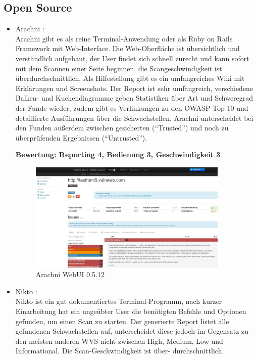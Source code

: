 \documentclass[12pt,oneside,a4paper,parskip]{scrbook}
\begin{document}
    \subsection{Open Source}
        \begin{itemize}
          \item Arachni \cite{Arachni}:\\
            Arachni gibt es als reine Terminal-Anwendung oder als Ruby on Rails Framework mit Web-Interface. Die Web-Oberfläche ist übersichtlich und verständlich aufgebaut, der User findet sich schnell zurecht und kann sofort mit dem Scannen einer Seite beginnen, die Scangeschwindigkeit ist überdurchschnittlich. Als Hilfestellung gibt es ein umfangreiches Wiki mit Erklärungen und Screenshots. Der Report ist sehr umfangreich, verschiedene Balken- und Kuchendiagramme geben Statistiken über Art und Schweregrad der Funde wieder, zudem gibt es Verlinkungen zu den OWASP Top 10 und detaillierte Ausführungen über die Schwachstellen. Arachni unterscheidet bei den Funden außerdem zwischen gesicherten (``Trusted'') und noch zu überprüfenden Ergebnissen (``Untrusted'').

            \textbf{Bewertung: Reporting 4, Bedienung 3, Geschwindigkeit 3}
            \begin{figure}[H]
              \centering
              \includegraphics[width=0.9\textwidth]{Images/Arachni}
              \caption[Arachni WebUI 0.5.12]{Arachni WebUI 0.5.12}
            \end{figure}
          \item Nikto \cite{Nikto}:\\
            Nikto ist ein gut dokumentiertes Terminal-Programm, nach kurzer Einarbeitung hat ein ungeübter User die benötigten Befehle und Optionen gefunden, um einen Scan zu starten.
            Der generierte Report listet alle gefundenen Schwachstellen auf, unterscheidet diese jedoch im Gegensatz zu den meisten anderen WVS nicht zwischen High, Medium, Low und Informational. Die Scan-Geschwindigkeit ist über- durchschnittlich.


\end{itemize}
\end{document}
